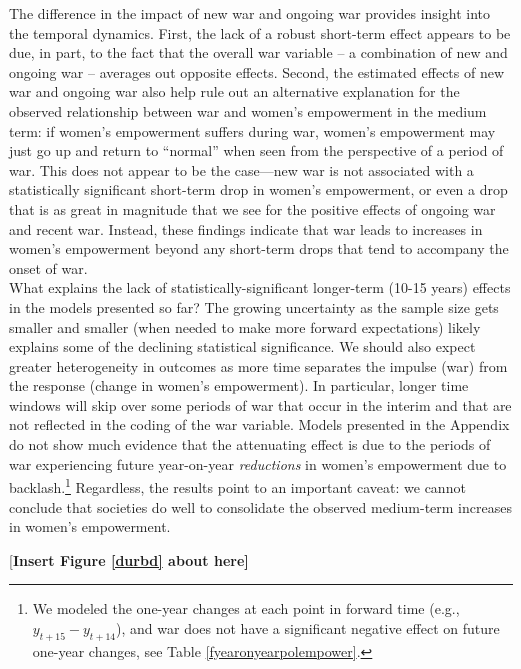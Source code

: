 \documentclass [12pt] {article}
\begin{document}
The difference in the impact of new war and ongoing war provides insight into the temporal dynamics. First, the lack of a robust  short-term effect appears to be due, in part, to the fact that the overall war variable -- a combination of new and ongoing war -- averages out opposite effects. Second, the estimated effects of new war and ongoing war also help rule out an alternative explanation for the observed relationship between war and women's empowerment in the medium term: if women's empowerment suffers during war, women's empowerment may just go up and return to ``normal'' when seen from the perspective of a period of war. This does not appear to be the case---new war is not associated with a statistically significant short-term drop in women's empowerment, or even a drop that is as great in magnitude that we see for the positive effects of ongoing war and recent war. Instead, these findings indicate that war leads to increases in women's empowerment beyond any short-term drops that tend to accompany the onset of war. \\

What explains the lack of statistically-significant longer-term (10-15 years) effects in the models presented so far? The growing uncertainty as the sample size gets smaller and smaller (when needed to make more forward expectations) likely explains some of the declining statistical significance. We should also expect greater heterogeneity in outcomes as more time separates the impulse (war) from the response (change in women's empowerment). In particular, longer time windows will skip over some periods of war that occur in the interim and that are not reflected in the coding of the war variable.  Models presented in the Appendix do not show much evidence that the attenuating effect is due to the periods of war experiencing future year-on-year \emph{reductions} in women's empowerment due to backlash.\footnote{We modeled the one-year changes at each point in forward time (e.g., $y_{t+15}-y_{t+14}$), and war does not have a significant negative effect on future one-year changes, see %
Table \ref{fyearonyearpolempower}.} Regardless, the results point to an important caveat: we cannot conclude that societies do well to consolidate the observed medium-term increases in women's empowerment.\\

\begin{center}
[\bf Insert Figure \ref{durbd} about here]
\end{center}
\vspace*{.2in}
\end{document}
